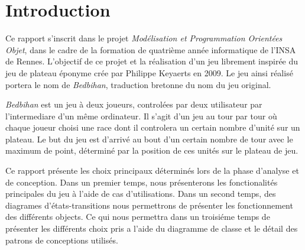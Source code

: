 \section{Introduction}
	
	Ce rapport s'inscrit dans le projet \emph{Modélisation et Programmation Orientées Objet}, dans le cadre de la formation de quatrième année informatique de l'INSA de Rennes. L'objectif de ce projet et la réalisation d'un jeu librement inspirée du jeu de plateau éponyme crée par Philippe Keyaerts en 2009. Le jeu ainsi réalisé portera le nom de \emph{Bedbihan}, traduction bretonne du nom du jeu original. 

	\emph{Bedbihan} est un jeu à deux joueurs, controlées par deux utilisateur par l'intermediare d'un même ordinateur. Il s'agit d'un jeu au tour par tour où chaque joueur choisi une race dont il controlera un certain nombre d'unité sur un plateau. Le but du jeu est d'arrivé au bout d'un certain nombre de tour avec le maximum de point, déterminé par la position de ces unités sur le plateau de jeu. 

	Ce rapport présente les choix principaux déterminés lors de la phase d'analyse et de conception. Dans un premier temps, nous présenterons les fonctionalités principales du jeu à l'aide de cas d'utilisations. Dans un second temps, des diagrames d'états-transitions nous permettrons de présenter les fonctionnement des différents objects. Ce qui nous permettra dans un troisiéme temps de présenter les différents choix pris a l'aide du diagramme de classe et le détail des patrons de conceptions utilisés. 





















